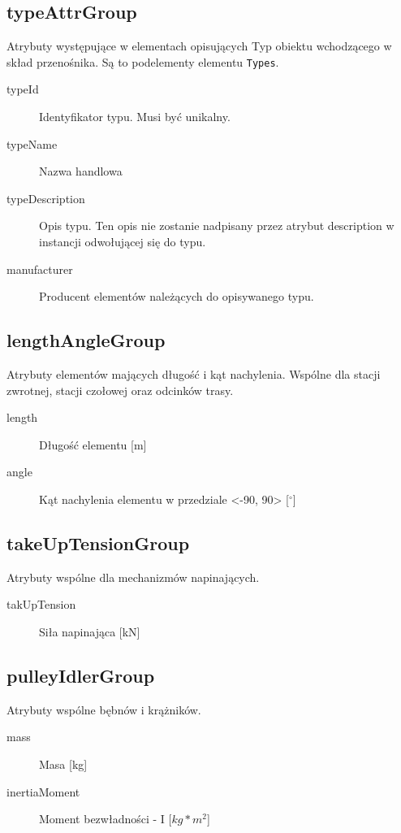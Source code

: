 \documentclass[12pt,a4paper]{article}
\begin{document}
\subsection{typeAttrGroup}
Atrybuty występujące w elementach opisujących Typ obiektu wchodzącego w skład
przenośnika.  Są to podelementy elementu {\tt Types}.

\begin{description}
\item[typeId] Identyfikator typu. Musi być unikalny.
\item[typeName] Nazwa handlowa
\item[typeDescription] Opis typu. Ten opis nie zostanie nadpisany przez atrybut
  description w instancji odwołującej się do typu.
\item[manufacturer] Producent elementów należących do opisywanego typu. 
\end{description}

\subsection{lengthAngleGroup}
Atrybuty elementów mających długość i kąt nachylenia. Wspólne dla stacji
zwrotnej, stacji czołowej oraz odcinków trasy.

\begin{description}
\item[length] Długość elementu [m]
\item[angle] Kąt nachylenia elementu w przedziale <-90, 90> [$^\circ$] 
\end{description}

\subsection{takeUpTensionGroup}
Atrybuty wspólne dla mechanizmów napinających.

\begin{description}
\item[takUpTension] Siła napinająca [kN]
\end{description}

\subsection{pulleyIdlerGroup}
Atrybuty wspólne bębnów i krążników.

\begin{description}
\item[mass] Masa [kg]
\item[inertiaMoment] Moment bezwładności - I [$kg*m^2$]
\end{description}
\end{document}
